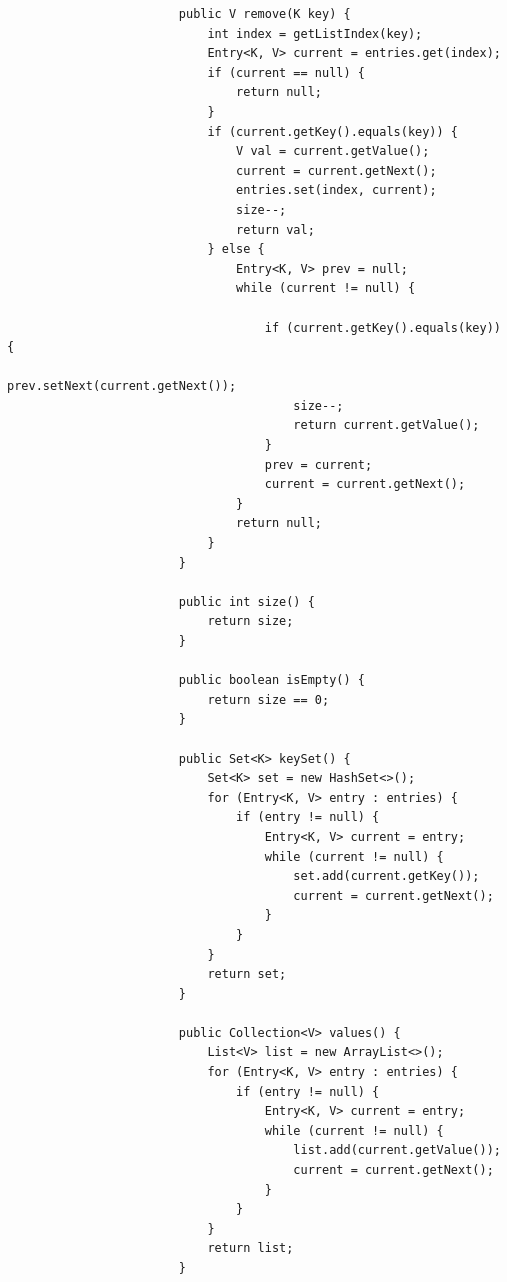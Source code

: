 \documentclass[a4paper, landscape, 8pt]{scrartcl}
\begin{document}
\begin{multicols*}{4}
\begin{lstlisting}
                        public V remove(K key) {
                            int index = getListIndex(key);
                            Entry<K, V> current = entries.get(index);
                            if (current == null) {
                                return null;
                            }
                            if (current.getKey().equals(key)) {
                                V val = current.getValue();
                                current = current.getNext();
                                entries.set(index, current);
                                size--;
                                return val;
                            } else {
                                Entry<K, V> prev = null;
                                while (current != null) {

                                    if (current.getKey().equals(key)) {
                                        prev.setNext(current.getNext());
                                        size--;
                                        return current.getValue();
                                    }
                                    prev = current;
                                    current = current.getNext();
                                }
                                return null;
                            }
                        }

                        public int size() {
                            return size;
                        }

                        public boolean isEmpty() {
                            return size == 0;
                        }

                        public Set<K> keySet() {
                            Set<K> set = new HashSet<>();
                            for (Entry<K, V> entry : entries) {
                                if (entry != null) {
                                    Entry<K, V> current = entry;
                                    while (current != null) {
                                        set.add(current.getKey());
                                        current = current.getNext();
                                    }
                                }
                            }
                            return set;
                        }

                        public Collection<V> values() {
                            List<V> list = new ArrayList<>();
                            for (Entry<K, V> entry : entries) {
                                if (entry != null) {
                                    Entry<K, V> current = entry;
                                    while (current != null) {
                                        list.add(current.getValue());
                                        current = current.getNext();
                                    }
                                }
                            }
                            return list;
                        }


\end{lstlisting}
\end{multicols*}
\end{document}
